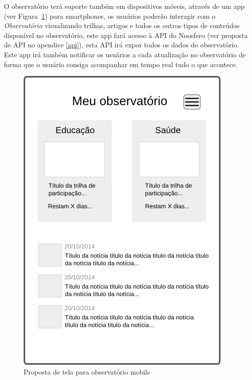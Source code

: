 \documentclass[12pt]{article}
\begin{document}
O observatório terá suporte também em dispositivos móveis, através de um app
(ver Figura~\ref{observatorio-mobile}) para smartphones, os usuários poderão
interagir com o {\it Observatório} visualizando trilhas, artigos e todos os outros
tipos de conteúdos disponível no observatório, este app fará acesso à API do
Noosfero (ver proposta de API no apendice \ref{api}), esta API irá expor todos
os dados do observatório. Este app irá também notificar os usuários a cada
atualização no observatório de forma que o usuário consiga acompanhar em tempo
real tudo o que acontece.

\begin{figure}[h!]
\center
\includegraphics[scale=0.50]{observatorio-mobile.png}
\caption{Proposta de tela para observatório mobile}
\label{observatorio-mobile}
\end{figure}
\end{document}
